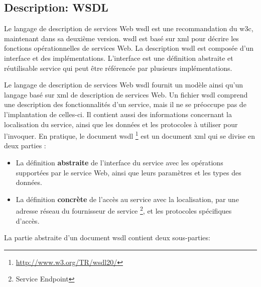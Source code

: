   \subsection{Description: WSDL}
  \label{sec:wsdl}

  Le langage de description de services Web \acrshort{wsdl}
  \cite{christensen2001web, chinnici2007web} est une recommandation du
  \acrshort{w3c}, maintenant dans sa deuxième version.
  \acrshort{wsdl} est basé sur \acrshort{xml} pour décrire les
  fonctions opérationnelles de services Web. La description
  \acrshort{wsdl} est composée d'un interface et des
  implémentations. L'interface est une définition abstraite et
  réutilisable service qui peut être référencée par plusieurs
  implémentations.\medskip

  Le langage de description de services Web \acrshort{wsdl}
  \cite{chinnici2007web} fournit un modèle ainsi qu'un langage basé
  sur \acrshort{xml} de description de services Web. Un fichier
  \acrshort{wsdl} comprend une description des fonctionnalités d'un
  service, mais il ne se préoccupe pas de l'implantation de celles-ci.
  Il contient aussi des informations concernant la localisation du
  service, ainsi que les données et les protocoles à utiliser pour
  l'invoquer. En pratique, le document \acrshort{wsdl}
  \footnote{\url{http://www.w3.org/TR/wsdl20/}} est un document
  \acrshort{xml} qui se divise en deux parties \cite{elie2010} :

  

  \SpecialItem
  \begin{itemize}
  \item La définition \textbf{abstraite} de l'interface du service
    avec les opérations supportées par le service Web, ainsi que leurs
    paramètres et les types des données.

  \item La définition \textbf{concrète} de l'accès au service avec la
    localisation, par une adresse réseau du fournisseur de service
    \footnote{Service Endpoint}, et les protocoles spécifiques
    d'accès.
  \end{itemize}
  \enddescription

  La partie abstraite d'un document \acrshort{wsdl} contient deux
  sous-parties:

